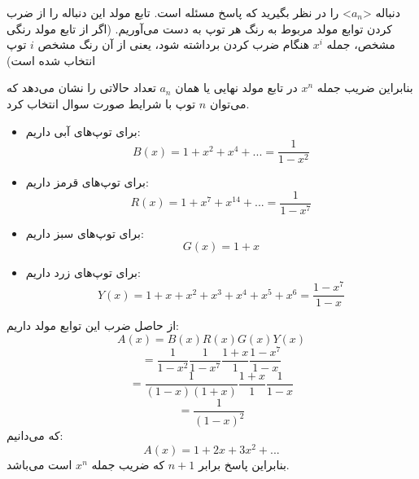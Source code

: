 \p
  دنباله <$a_n$> را در نظر بگیرید که پاسخ مسئله است. تابع مولد این دنباله را از ضرب کردن توابع مولد مربوط به رنگ هر توپ به دست می‌آوریم. (اگر از تابع مولد رنگی مشخص، جمله $x^i$ هنگام ضرب کردن برداشته شود، یعنی از آن رنگ مشخص $i$ توپ انتخاب شده است) 

  \p
بنابراین ضریب جمله $x^n$ در تابع مولد نهایی یا همان $a_n$ تعداد حالاتی را نشان می‌دهد که می‌توان $n$ توپ با شرایط صورت سوال انتخاب کرد.

        
\begin{itemize}
    \item 
        برای توپ‌های آبی داریم:
        $$B(x) = 1 + x^2 + x^4 + ... = \frac{1}{1 - x^2}$$
    \item 
    برای توپ‌های قرمز داریم:
            $$R(x) = 1 + x^7 + x^{14} + ... = \frac{1}{1 - x^7}$$

    \item 
    برای توپ‌های سبز داریم:
            $$G(x) = 1 + x$$

    \item 
        برای توپ‌های زرد داریم:
            $$Y(x) = 1 + x + x^2 + x^3 + x^4 + x^5 + x^6 = \frac{1 - x^7}{1 - x}$$
\end{itemize}

  \p
  از حاصل ضرب این توابع مولد داریم:
$$A(x) = B(x)R(x)G(x)Y(x)$$
$$= \frac{1}{1 - x^2}\frac{1}{1 - x^7}\frac{1 + x}{1}\frac{1 - x^7}{1 - x}$$
$$= \frac{1}{(1 - x)(1 + x)} \frac{1 + x}{1} \frac{1}{1 - x}$$
$$= \frac{1}{(1 - x)^2}$$
که می‌دانیم:
        $$A(x) = 1 + 2x + 3x^2 + ... $$
  \p
  بنابراین پاسخ برابر 
        $n + 1$
         که ضریب جمله $x^n$ است می‌باشد.